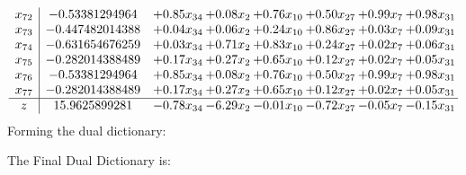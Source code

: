 \documentclass[8pt]{article}
\begin{document}
\[\begin{array}{c| c c@{\hskip 2pt} c@{\hskip 2pt} c@{\hskip 2pt} c@{\hskip 2pt} c@{\hskip 2pt} c@{\hskip 2pt} }
 x_{72}   &  -0.53381294964 & +  0.85 x_{34} & +  0.08 x_{2} & +  0.76 x_{10} & +  0.50 x_{27} & +  0.99 x_{7} & +  0.98 x_{31}\\
 x_{73}   &  -0.447482014388 & +  0.04 x_{34} & +  0.06 x_{2} & +  0.24 x_{10} & +  0.86 x_{27} & +  0.03 x_{7} & +  0.09 x_{31}\\
 x_{74}   &  -0.631654676259 & +  0.03 x_{34} & +  0.71 x_{2} & +  0.83 x_{10} & +  0.24 x_{27} & +  0.02 x_{7} & +  0.06 x_{31}\\
 x_{75}   &  -0.282014388489 & +  0.17 x_{34} & +  0.27 x_{2} & +  0.65 x_{10} & +  0.12 x_{27} & +  0.02 x_{7} & +  0.05 x_{31}\\
 x_{76}   &  -0.53381294964 & +  0.85 x_{34} & +  0.08 x_{2} & +  0.76 x_{10} & +  0.50 x_{27} & +  0.99 x_{7} & +  0.98 x_{31}\\
 x_{77}   &  -0.282014388489 & +  0.17 x_{34} & +  0.27 x_{2} & +  0.65 x_{10} & +  0.12 x_{27} & +  0.02 x_{7} & +  0.05 x_{31}\\
\hline
z    &  15.9625899281 & -0.78 x_{34} & -6.29 x_{2} & -0.01 x_{10} & -0.72 x_{27} & -0.05 x_{7} & -0.15 x_{31}\\
\end{array}\]
Forming the dual dictionary:

The Final Dual Dictionary is: 
\end{document}

